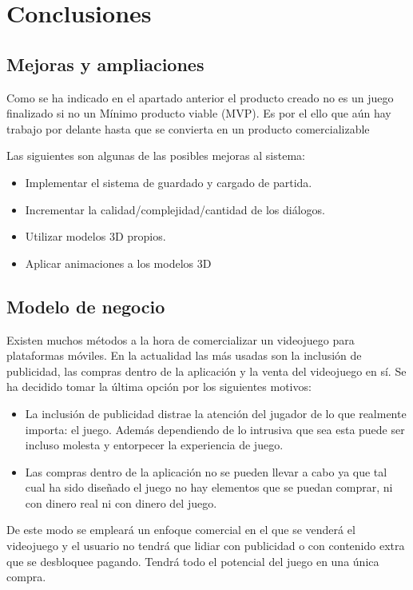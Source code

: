 \chapter{Conclusiones}

\section{Mejoras y ampliaciones}

Como se ha indicado en el apartado anterior el producto creado no es un juego finalizado si no un Mínimo producto viable (MVP). Es por el ello que aún hay trabajo por delante hasta que se convierta en un producto comercializable

Las siguientes son algunas de las posibles mejoras al sistema:

\begin{itemize}
	\item Implementar el sistema de guardado y cargado de partida.
	\item Incrementar la calidad/complejidad/cantidad de los diálogos.
	\item Utilizar modelos 3D propios.
	\item Aplicar animaciones a los modelos 3D
\end{itemize}

\section{Modelo de negocio}

Existen muchos métodos a la hora de comercializar un videojuego para plataformas móviles. En la actualidad las más usadas son la inclusión de publicidad, las compras dentro de la aplicación y la venta del videojuego en sí.
Se ha decidido tomar la última opción por los siguientes motivos: 

\begin{itemize}
	\item La inclusión de publicidad distrae la atención del jugador de lo que realmente importa: el juego. Además dependiendo de lo intrusiva que sea esta puede ser incluso molesta y entorpecer la experiencia de juego.
	\item Las compras dentro de la aplicación no se pueden llevar a cabo ya que tal cual ha sido diseñado el juego no hay elementos que se puedan comprar, ni con dinero real ni con dinero del juego.
\end{itemize}

De este modo se empleará un enfoque comercial en el que se venderá el videojuego y el usuario no tendrá que lidiar con publicidad o con contenido extra que se desbloquee pagando. Tendrá todo el potencial del juego en una única compra.

